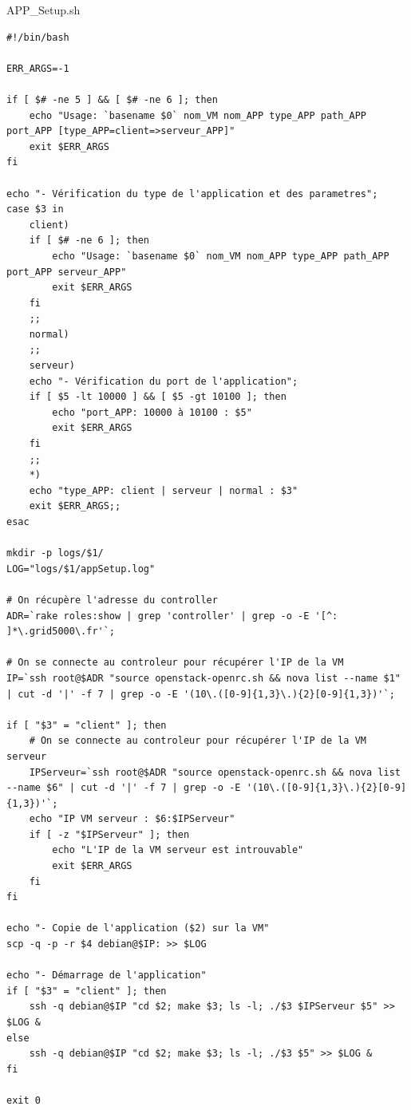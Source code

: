 \documentclass{report}
\begin{document}
    
    \newpage
    \begin{center}
        APP\_Setup.sh
    \end{center}
    \begin{verbatim}
#!/bin/bash

ERR_ARGS=-1

if [ $# -ne 5 ] && [ $# -ne 6 ]; then
    echo "Usage: `basename $0` nom_VM nom_APP type_APP path_APP port_APP [type_APP=client=>serveur_APP]"
    exit $ERR_ARGS
fi

echo "- Vérification du type de l'application et des parametres";
case $3 in
    client)
    if [ $# -ne 6 ]; then
        echo "Usage: `basename $0` nom_VM nom_APP type_APP path_APP port_APP serveur_APP"
        exit $ERR_ARGS
    fi
    ;;
    normal)
	;;
    serveur)
    echo "- Vérification du port de l'application";
    if [ $5 -lt 10000 ] && [ $5 -gt 10100 ]; then
        echo "port_APP: 10000 à 10100 : $5"
        exit $ERR_ARGS
    fi	
    ;;
    *)
    echo "type_APP: client | serveur | normal : $3"
    exit $ERR_ARGS;;
esac

mkdir -p logs/$1/
LOG="logs/$1/appSetup.log"

# On récupère l'adresse du controller
ADR=`rake roles:show | grep 'controller' | grep -o -E '[^: ]*\.grid5000\.fr'`;

# On se connecte au controleur pour récupérer l'IP de la VM
IP=`ssh root@$ADR "source openstack-openrc.sh && nova list --name $1" | cut -d '|' -f 7 | grep -o -E '(10\.([0-9]{1,3}\.){2}[0-9]{1,3})'`;

if [ "$3" = "client" ]; then
    # On se connecte au controleur pour récupérer l'IP de la VM serveur
    IPServeur=`ssh root@$ADR "source openstack-openrc.sh && nova list --name $6" | cut -d '|' -f 7 | grep -o -E '(10\.([0-9]{1,3}\.){2}[0-9]{1,3})'`;
    echo "IP VM serveur : $6:$IPServeur"
    if [ -z "$IPServeur" ]; then
        echo "L'IP de la VM serveur est introuvable"
        exit $ERR_ARGS
    fi
fi

echo "- Copie de l'application ($2) sur la VM"
scp -q -p -r $4 debian@$IP: >> $LOG

echo "- Démarrage de l'application"
if [ "$3" = "client" ]; then
    ssh -q debian@$IP "cd $2; make $3; ls -l; ./$3 $IPServeur $5" >> $LOG &
else
 	ssh -q debian@$IP "cd $2; make $3; ls -l; ./$3 $5" >> $LOG &
fi

exit 0
    \end{verbatim}
\end{document}
